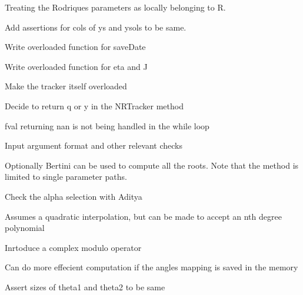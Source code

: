 \begin{DoxyRefList}
Treating the Rodriques parameters as locally belonging to R. 

Add assertions for cols of ys and ysols to be same.  
\item[Member \mbox{\hyperlink{classRootTracker_a81f1227c2436cf1a84a7b8608b683bdd}{Root\+Tracker\+::NRCTracker}} (Vector\+Xcd x, Vector\+Xcd y, std\+::function$<$ Vector\+Xcd(\+Vector\+Xcd)$>$ f, std\+::function$<$ Matrix\+Xcd(\+Vector\+Xcd)$>$ Jfy, double eps=pow(10, -\/10))]\label{todo__todo000003}%
%
Write overloaded function for save\+Date 

Write overloaded function for eta and J 

Make the tracker itself overloaded  
\item[Member \mbox{\hyperlink{classRootTracker_a6bb3dcb73ea58ac44ab15d7803de3d5a}{Root\+Tracker\+::NRTracker}} (Vector\+Xd x, Vector\+Xd y, std\+::function$<$ Vector\+Xd(\+Vector\+Xd)$>$ f, std\+::function$<$ Matrix\+Xd(\+Vector\+Xd)$>$ Jfy, double eps=pow(10, -\/10))]\label{todo__todo000002}%
%
Decide to return q or y in the NRTracker method 

fval returning nan is not being handled in the while loop 

Input argument format and other relevant checks  
\item[Member \mbox{\hyperlink{classRootTracker_a9b24fe40d4f662b984311365ffd07aa2}{Root\+Tracker\+::SEI}} (Matrix\+Xd allroots, double alpha, int selectedroot, std\+::function$<$ Vector\+Xd(double)$>$ compute\+Xfrom\+Param, Ref$<$ Vector\+Xd $>$ alphahist, Ref$<$ Matrix\+Xd $>$ disthist, std\+::function$<$ Vector\+Xd(\+Vector\+Xd)$>$ f, std\+::function$<$ Matrix\+Xd(\+Vector\+Xd)$>$ Jfy, std\+::function$<$ Vector\+Xd(double)$>$ computeq\+Extfrom\+Param)]\label{todo__todo000006}%
%
Optionally Bertini can be used to compute all the roots. Note that the method is limited to single parameter paths. 

Check the alpha selection with Aditya 

Assumes a quadratic interpolation, but can be made to accept an nth degree polynomial  
\item[Member \mbox{\hyperlink{utils_8hh_a5d8b5ec8d7d9f33e2b89dbd54a9dfbd6}{s1\+CDist}} (Vector\+Xcd theta1, Vector\+Xcd theta2)]\label{todo__todo000011}%
%
Inrtoduce a complex modulo operator  
\item[Member \mbox{\hyperlink{utils_8hh_aa55cfeada673b3ce1ce1e504925e117c}{s1\+Dist}} (Vector\+Xd theta1, Vector\+Xd theta2)]\label{todo__todo000010}%
%
Can do more effecient computation if the angles mapping is saved in the memory 

Assert sizes of theta1 and theta2 to be same 
\end{DoxyRefList}